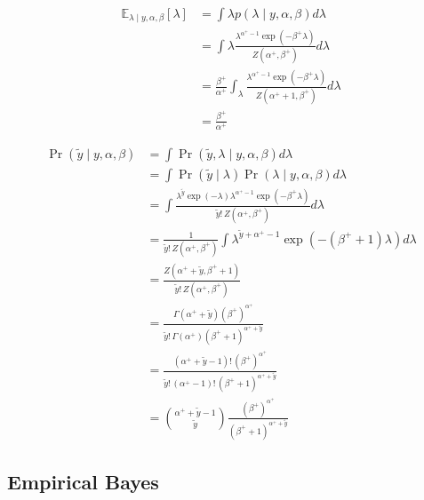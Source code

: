 \documentclass{article}
\def\cond{\; | \;}
\begin{document}
{{\begin{equation}
\begin{aligned}
    \mathbb{E}_{\lambda\cond y,\alpha,\beta}[\lambda] 
    &= \int \lambda p(\lambda \cond y,\alpha,\beta)d\lambda\\
    &= \int \lambda 
    \frac{\lambda^{\alpha^+ -1}\exp(-\beta^+\lambda)}
    {Z(\alpha^+,\beta^+)}
    d\lambda\\
    &= \frac{\beta^+}{\alpha^+}\int_{\lambda}
    \frac{\lambda^{\alpha^+ -1}\exp(-\beta^+\lambda)}
    {Z(\alpha^+ + 1,\beta^+)}
    d\lambda\\
    &= \frac{\beta^+}{\alpha^+}
\end{aligned}
\end{equation}
\item
\begin{equation}
\begin{aligned}
    \Pr(\tilde{y}\cond y,\alpha,\beta) 
    &= \int \Pr(\tilde{y},\lambda\cond y,\alpha,\beta)d\lambda\\
    &= \int \Pr(\tilde{y}\cond\lambda)\Pr(\lambda\cond y,\alpha,\beta)d\lambda\\
    &= \int \frac{\lambda^{\tilde{y}}\exp(-\lambda)
    \lambda^{\alpha^+ -1}\exp(-\beta^+ \lambda)}
    {\tilde{y}! \, Z(\alpha^+,\beta^+)}d\lambda\\
    &= \frac{1}{\tilde{y}! \, Z(\alpha^+,\beta^+)}
    \int \lambda^{\tilde{y}+\alpha^+ - 1}\exp(-(\beta^+ + 1)\lambda)d\lambda\\
    &= \frac{Z(\alpha^+ + \tilde{y}, \beta^+ + 1)}
    {\tilde{y}! \, Z(\alpha^+,\beta^+)}\\
    &= \frac{\Gamma(\alpha^+ + \tilde{y}) (\beta^+)^{\alpha^+}}
    {\tilde{y}! \, \Gamma(\alpha^+)(\beta^+ + 1)^{\alpha^+ + \tilde{y}}}\\
    &= \frac{(\alpha^+ + \tilde{y} - 1)! \, (\beta^+)^{\alpha^+}}
    {\tilde{y}! \, (\alpha^+ - 1)! \, (\beta^+ + 1)^{\alpha^+ + \tilde{y}}}\\
    &= {\alpha^+ + \tilde{y} - 1 \choose \tilde{y}}
    \frac{(\beta^+)^{\alpha^+}}{(\beta^+ + 1)^{\alpha^+ + \tilde{y}}}
\end{aligned}
\end{equation}
}
}

\pagebreak

\subsection{Empirical Bayes}
\end{document}
